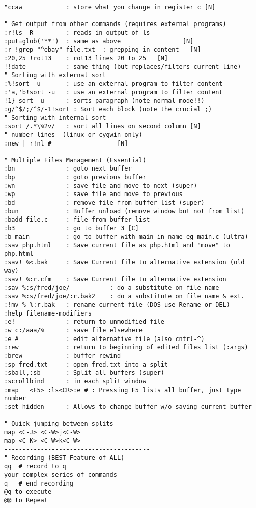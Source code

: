 \documentclass[10pt,landscape]{article}
\begin{document}
\begin{multicols}{2}
\begin{verbatim}
"ccaw            : store what you change in register c [N]
----------------------------------------
" Get output from other commands (requires external programs)
:r!ls -R         : reads in output of ls
:put=glob('**')  : same as above                 [N]
:r !grep "^ebay" file.txt  : grepping in content   [N]
:20,25 !rot13    : rot13 lines 20 to 25   [N]
!!date           : same thing (but replaces/filters current line)
" Sorting with external sort
:%!sort -u       : use an external program to filter content
:'a,'b!sort -u   : use an external program to filter content
!1} sort -u      : sorts paragraph (note normal mode!!)
:g/^$/;/^$/-1!sort : Sort each block (note the crucial ;)
" Sorting with internal sort
:sort /.*\%2v/   : sort all lines on second column [N]
" number lines  (linux or cygwin only)
:new | r!nl #                  [N]
----------------------------------------
" Multiple Files Management (Essential)
:bn              : goto next buffer
:bp              : goto previous buffer
:wn              : save file and move to next (super)
:wp              : save file and move to previous
:bd              : remove file from buffer list (super)
:bun             : Buffer unload (remove window but not from list)
:badd file.c     : file from buffer list
:b3              : go to buffer 3 [C]
:b main          : go to buffer with main in name eg main.c (ultra)
:sav php.html    : Save current file as php.html and "move" to php.html
:sav! %<.bak     : Save Current file to alternative extension (old way)
:sav! %:r.cfm    : Save Current file to alternative extension
:sav %:s/fred/joe/           : do a substitute on file name
:sav %:s/fred/joe/:r.bak2    : do a substitute on file name & ext.
:!mv % %:r.bak   : rename current file (DOS use Rename or DEL)
:help filename-modifiers
:e!              : return to unmodified file
:w c:/aaa/%      : save file elsewhere
:e #             : edit alternative file (also cntrl-^)
:rew             : return to beginning of edited files list (:args)
:brew            : buffer rewind
:sp fred.txt     : open fred.txt into a split
:sball,:sb       : Split all buffers (super)
:scrollbind      : in each split window
:map   <F5> :ls<CR>:e # : Pressing F5 lists all buffer, just type number
:set hidden      : Allows to change buffer w/o saving current buffer
----------------------------------------
" Quick jumping between splits
map <C-J> <C-W>j<C-W>_
map <C-K> <C-W>k<C-W>_
----------------------------------------
" Recording (BEST Feature of ALL)
qq  # record to q
your complex series of commands
q   # end recording
@q to execute
@@ to Repeat

\end{verbatim}
\end{multicols}
\end{document}
